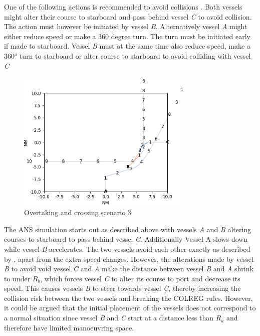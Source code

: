 One of the following actions is recommended to avoid collisions \cite{ecolreg_overtaking-and-crossing-2}. Both vessels might alter their course to starboard and pass behind vessel \textit{C} to avoid collision. The action must however be initiated by vessel \textit{B}. Alternatively vessel \textit{A} might either reduce speed or make a 360 degree turn. The turn must be initiated early if made to starboard. Vessel \textit{B} must at the same time also reduce speed, make a \ang{360} turn to starboard or alter course to starboard to avoid colliding with vessel \textit{C}



\begin{figure}[H]
    \centering
    \includegraphics[width=0.75\textwidth,height=0.75\textheight,keepaspectratio]{../src/img/overtaking_crossing_2_res.png}
    \caption{Overtaking and crossing scenario 3}
    \label{fig:overtaking-and-crossing-2-res}
\end{figure}

The ANS simulation starts out as described above with vessels \textit{A} and \textit{B} altering courses to starboard to pass behind vessel \textit{C}. Additionally Vessel A slows down while vessel \textit{B} accelerates. The two vessels avoid each other exactly as described by \textcite{ecolreg_overtaking-and-crossing-2}, apart from the extra speed changes. However, the alterations made by vessel \textit{B} to avoid void vessel \textit{C} and \textit{A} make the distance between vessel \textit{B} and \textit{A} shrink to under $R_b$, which forces vessel \textit{C} to alter its course to port and decrease its speed. This causes vessels \textit{B} to steer towards vessel \textit{C}, thereby increasing the collision risk between the two vessels and breaking the COLREG rules. However, it could be argued that the initial placement of the vessels does not correspond to a normal situation since vessel \textit{B} and \textit{C} start at a distance less than $R_a$ and therefore have limited manoeuvring space.


